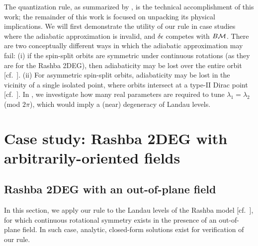 \documentclass[aps, showpacs, twocolumn, notitlepage, superscriptaddress]{revtex4-1}
\begin{document}
The quantization rule, as summarized by , is the technical accomplishment of this work; the remainder of this work is focused on unpacking its physical implications. We will first demonstrate the utility of our rule in case studies where the adiabatic approximation is invalid, and $\delta \epsilon$ competes with $B{\cal M}$. There are two conceptually different ways in which the adiabatic approximation may fail: (i) if the spin-split orbits are  symmetric under continuous rotations (as they are for the Rashba 2DEG), then adiabaticity may be lost over the entire orbit [cf.\ ]. (ii) For asymmetric spin-split orbits, adiabaticity may be lost in the vicinity of a single isolated point, where orbits intersect at a type-II Dirac point [cf.\ ]. 
In , we investigate how many real parameters are required to tune $\lambda_1{=}\lambda_2$ (mod $2\pi$), which would imply a (near) degeneracy of Landau levels.  

\section{Case study: Rashba 2DEG with arbitrarily-oriented fields}

\subsection{Rashba 2DEG with an out-of-plane field}\label{sec:Rashba}

In this section, we apply our rule to the Landau levels of the Rashba model [cf.\ ], for which continuous rotational symmetry exists in the presence of an out-of-plane field. In such case, analytic, closed-form solutions\cite{bychkov_oscillatory_1984} exist for verification of our rule. 
\end{document}
